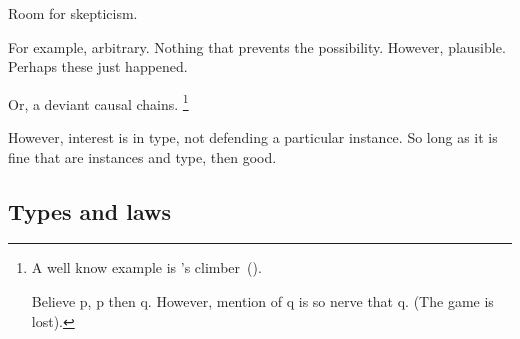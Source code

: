 \begin{note}
  Room for skepticism.

  For example, arbitrary.
  Nothing that prevents the possibility.
  However, plausible.
  Perhaps these  just happened.

  Or, a deviant causal chains.%
  \footnote{
    A well know example is \citeauthor{Davidson:1973vd}'s climber~(\citeyear[79]{Davidson:1973vd}).

    Believe p, p then q.
    However, mention of q is so nerve that q.
    (The game is lost).
  }

  However, interest is in type, not defending a particular instance.
  So long as it is fine that are instances and type, then good.
\end{note}


\subsection{Types and laws}

